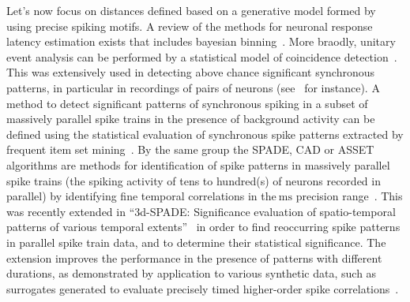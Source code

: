 \documentclass[brainsci, %
               review,submit,pdftex,moreauthors%
               ]{Definitions/mdpi}
\newcommand{\ms}{\si{\milli\second}}%
\begin{document}
Let's now focus on distances defined based on a generative model formed by using precise spiking motifs. A review of the methods for neuronal response latency estimation exists that includes bayesian binning~\citep{levakova_review_2015}. More braodly, unitary event analysis can be performed by a statistical model of coincidence detection~\citep{grun_unitary_2010}. This was extensively used in detecting above chance significant synchronous patterns, in particular in recordings of pairs of neurons (see~\citep{riehle_spike_1997} for instance). A method to detect significant patterns of synchronous spiking in a subset of massively parallel spike trains in the presence of background activity can be defined using the statistical evaluation of synchronous spike patterns extracted by frequent item set mining~\citep{torre_statistical_2013}. By the same group the SPADE, CAD or ASSET algorithms are methods for identification of spike patterns in massively parallel spike trains (the spiking activity of tens to hundred(s) of neurons recorded in parallel) by identifying fine temporal correlations in the$~\ms$ precision range~\citep{quaglio_methods_2018}. This was recently extended in ``3d-SPADE: Significance evaluation of spatio-temporal patterns of various temporal extents''~\citep{stella_3d-spade_2019} in order to find reoccurring spike patterns in parallel spike train data, and to determine their statistical significance. The extension improves the performance in the presence of patterns with different durations, as demonstrated by application to various synthetic data, such as surrogates generated to evaluate precisely timed higher-order spike correlations~\citep{stella_comparing_2022}.
\end{document}
